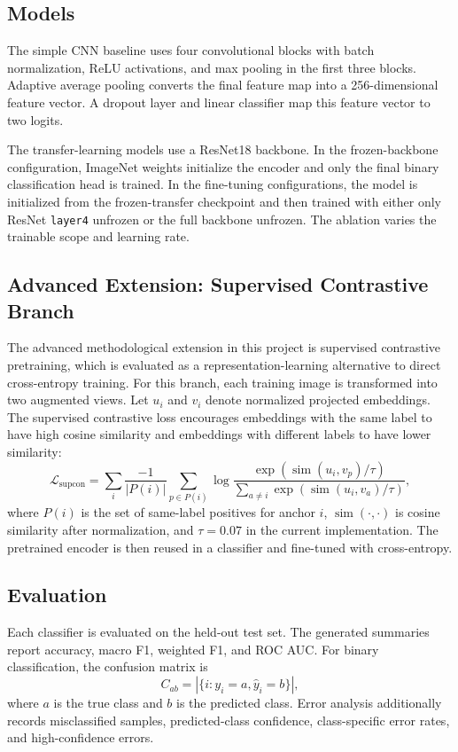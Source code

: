 \subsection{Models}

The simple CNN baseline uses four convolutional blocks with batch normalization, ReLU activations, and max pooling in the first three blocks. Adaptive average pooling converts the final feature map into a 256-dimensional feature vector. A dropout layer and linear classifier map this feature vector to two logits.

The transfer-learning models use a ResNet18 backbone. In the frozen-backbone configuration, ImageNet weights initialize the encoder and only the final binary classification head is trained. In the fine-tuning configurations, the model is initialized from the frozen-transfer checkpoint and then trained with either only ResNet \texttt{layer4} unfrozen or the full backbone unfrozen. The ablation varies the trainable scope and learning rate.

\subsection{Advanced Extension: Supervised Contrastive Branch}

The advanced methodological extension in this project is supervised contrastive pretraining, which is evaluated as a representation-learning alternative to direct cross-entropy training. For this branch, each training image is transformed into two augmented views. Let \(u_i\) and \(v_i\) denote normalized projected embeddings. The supervised contrastive loss encourages embeddings with the same label to have high cosine similarity and embeddings with different labels to have lower similarity:
\begin{equation}
  \mathcal{L}_{\mathrm{supcon}}
  =
  \sum_{i}
  \frac{-1}{|P(i)|}
  \sum_{p\in P(i)}
  \log
  \frac{\exp(\operatorname{sim}(u_i,v_p)/\tau)}
       {\sum_{a\neq i}\exp(\operatorname{sim}(u_i,v_a)/\tau)},
\end{equation}
where \(P(i)\) is the set of same-label positives for anchor \(i\), \(\operatorname{sim}(\cdot,\cdot)\) is cosine similarity after normalization, and \(\tau=0.07\) in the current implementation. The pretrained encoder is then reused in a classifier and fine-tuned with cross-entropy.

\subsection{Evaluation}

Each classifier is evaluated on the held-out test set. The generated summaries report accuracy, macro F1, weighted F1, and ROC AUC. For binary classification, the confusion matrix is
\begin{equation}
  C_{ab}=\left|\{i:y_i=a,\hat{y}_i=b\}\right|,
\end{equation}
where \(a\) is the true class and \(b\) is the predicted class. Error analysis additionally records misclassified samples, predicted-class confidence, class-specific error rates, and high-confidence errors.
